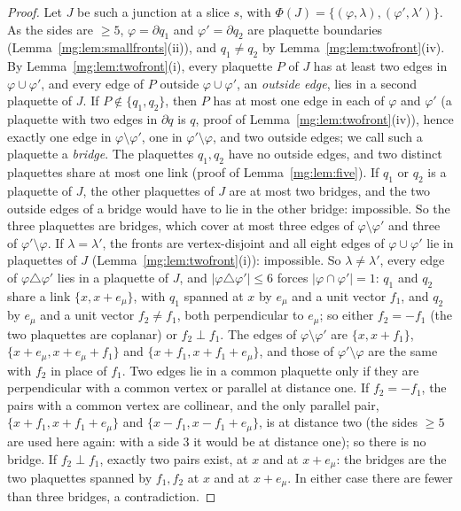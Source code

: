 \documentclass[11pt,a4paper]{article}
\theoremstyle{definition}
\theoremstyle{remark}
\begin{document}
\begin{proof}
Let $J$ be such a junction at a slice $s$, with $\Phi(J)=\{(\varphi,\lambda),(\varphi',\lambda')\}$. As the sides are $\ge5$, $\varphi=\partial q_1$ and $\varphi'=\partial q_2$ are plaquette
boundaries (Lemma~\ref{mg:lem:smallfronts}(ii)), and $q_1\ne q_2$ by Lemma~\ref{mg:lem:twofront}(iv). By Lemma~\ref{mg:lem:twofront}(i), every plaquette $P$ of $J$
has at least two edges in $\varphi\cup\varphi'$, and every edge of $P$ outside $\varphi\cup\varphi'$, an \emph{outside edge}, lies in a second plaquette of $J$. If
$P\notin\{q_1,q_2\}$, then $P$ has at most one edge in each of $\varphi$ and $\varphi'$ (a plaquette with two edges in $\partial q$ is $q$, proof of
Lemma~\ref{mg:lem:twofront}(iv)), hence exactly one edge in $\varphi\setminus\varphi'$, one in $\varphi'\setminus\varphi$, and two outside edges; we call such a plaquette a
\emph{bridge}. The plaquettes $q_1,q_2$ have no outside edges, and two distinct plaquettes share at most one link (proof of Lemma~\ref{mg:lem:five}).
If $q_1$ or $q_2$ is a plaquette of $J$, the other plaquettes of $J$ are at most two bridges, and the two outside edges of a bridge would have to lie in
the other bridge: impossible. So the three plaquettes are bridges, which cover at most three edges of $\varphi\setminus\varphi'$ and three of $\varphi'\setminus\varphi$.
If $\lambda=\lambda'$, the fronts are vertex-disjoint and all eight edges of $\varphi\cup\varphi'$ lie in plaquettes of $J$ (Lemma~\ref{mg:lem:twofront}(i)):
impossible. So $\lambda\ne\lambda'$, every edge of $\varphi\triangle\varphi'$ lies in a plaquette of $J$, and $|\varphi\triangle\varphi'|\le6$ forces $|\varphi\cap\varphi'|=1$: $q_1$ and $q_2$
share a link $\{x,x+e_\mu\}$, with $q_1$ spanned at $x$ by $e_\mu$ and a unit vector $f_1$, and $q_2$ by $e_\mu$ and a unit vector $f_2\ne f_1$, both
perpendicular to $e_\mu$; so either $f_2=-f_1$ (the two plaquettes are coplanar) or $f_2\perp f_1$. The edges of $\varphi\setminus\varphi'$ are $\{x,x+f_1\}$,
$\{x+e_\mu,x+e_\mu+f_1\}$ and $\{x+f_1,x+f_1+e_\mu\}$, and those of $\varphi'\setminus\varphi$ are the same with $f_2$ in place of $f_1$. Two edges lie in a common
plaquette only if they are perpendicular with a common vertex or parallel at distance one. If $f_2=-f_1$, the pairs with a common vertex are collinear,
and the only parallel pair, $\{x+f_1,x+f_1+e_\mu\}$ and $\{x-f_1,x-f_1+e_\mu\}$, is at distance two (the sides $\ge5$ are used here again: with a side $3$ it
would be at distance one); so there is no bridge. If $f_2\perp f_1$, exactly two pairs exist, at $x$ and at $x+e_\mu$: the bridges are the two plaquettes
spanned by $f_1,f_2$ at $x$ and at $x+e_\mu$. In either case there are fewer than three bridges, a contradiction.
\end{proof}
\end{document}
